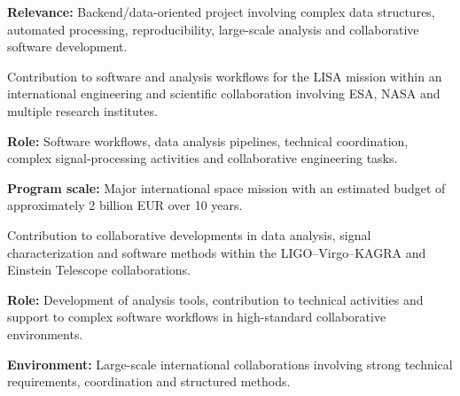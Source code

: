 \documentclass[8pt,a4paper,ragged2e,withhyper]{altacv}
\begin{document}
\textbf{Relevance:} Backend/data-oriented project involving complex data structures, automated processing, reproducibility, large-scale analysis and collaborative software development.

\divider


Contribution to software and analysis workflows for the LISA mission within an international engineering and scientific collaboration involving ESA, NASA and multiple research institutes.

\textbf{Role:} Software workflows, data analysis pipelines, technical coordination, complex signal-processing activities and collaborative engineering tasks.

\textbf{Program scale:} Major international space mission with an estimated budget of approximately 2 billion EUR over 10 years.

\divider


Contribution to collaborative developments in data analysis, signal characterization and software methods within the LIGO--Virgo--KAGRA and Einstein Telescope collaborations.

\textbf{Role:} Development of analysis tools, contribution to technical activities and support to complex software workflows in high-standard collaborative environments.

\textbf{Environment:} Large-scale international collaborations involving strong technical requirements, coordination and structured methods.


\vspace{-.3cm}
{\small
{}
}
\\
\end{document}
